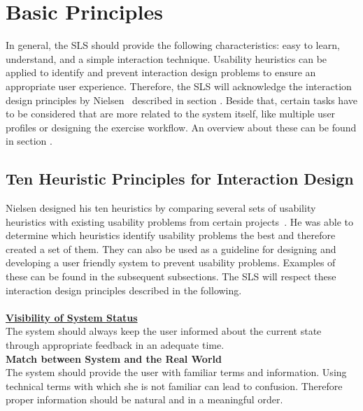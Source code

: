 \section{Basic Principles}\label{4_1_general}
In general, the SLS should provide the following characteristics: easy to learn, understand, and a simple interaction technique.
Usability heuristics can be applied to identify and prevent interaction design problems to ensure an appropriate user experience.
Therefore, the SLS will acknowledge the interaction design principles by Nielsen~\cite{Nielsen_1994-he} described in section \textit{}.
Beside that, certain tasks have to be considered that are more related to the system itself, like multiple user profiles or designing the exercise workflow.
An overview about these can be found in section \textit{}.

\subsection{Ten Heuristic Principles for Interaction Design}\label{nielsenDesignPrinciples}
Nielsen designed his ten heuristics by comparing several sets of usability heuristics with existing usability problems from certain projects~\cite{Nielsen_1994-he}.
He was able to determine which heuristics identify usability problems the best and therefore created a set of them.
They can also be used as a guideline for designing and developing a user friendly system to prevent usability problems.
Examples of these can be found in the subsequent subsections.
The SLS will respect these interaction design principles described in the following.
\\\\
\textbf{\hyperref[4_1_1_visibilitySystemStatus]{Visibility of System Status}}\\
The system should always keep the user informed about the current state through appropriate feedback in an adequate time.\\

\textbf{Match between System and the Real World}\\
The system should provide the user with familiar terms and information. Using technical terms with which she is not familiar can lead to confusion. Therefore proper information should be natural and in a meaningful order.\\

